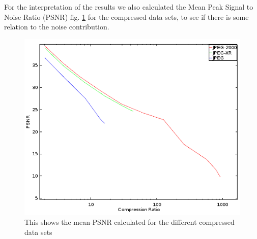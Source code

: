 \documentclass[10pt,a4paper]{article}
\begin{document}
For the interpretation of the results we also calculated the Mean Peak Signal to Noise Ratio (PSNR) fig. \ref{fig:psnr} for the compressed data sets, to see if there is some relation to the noise contribution.
\begin{figure}[!htp]
	\includegraphics[width=\textwidth]{img/psnr.png}
	\caption{This shows the mean-PSNR calculated for the different compressed data
	\label{fig:psnr} sets}
\end{figure} 
\end{document}
